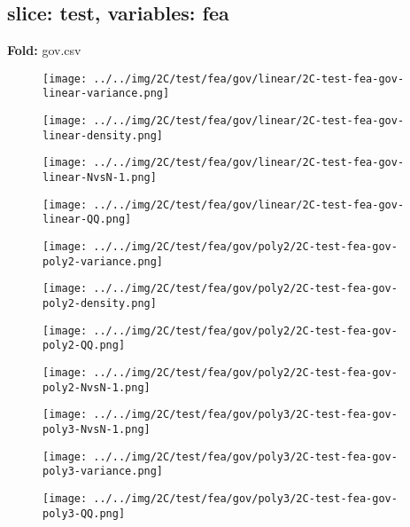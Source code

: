 \subsection{slice: test, variables: fea}
\textbf{Fold:} gov.csv
\begin{figure}[H]
\centering	\texttt{[image: ../../img/2C/test/fea/gov/linear/2C-test-fea-gov-linear-variance.png]}
\end{figure}
\begin{figure}[H]
\centering	\texttt{[image: ../../img/2C/test/fea/gov/linear/2C-test-fea-gov-linear-density.png]}
\end{figure}
\begin{figure}[H]
\centering	\texttt{[image: ../../img/2C/test/fea/gov/linear/2C-test-fea-gov-linear-NvsN-1.png]}
\end{figure}
\begin{figure}[H]
\centering	\texttt{[image: ../../img/2C/test/fea/gov/linear/2C-test-fea-gov-linear-QQ.png]}
\end{figure}
\begin{figure}[H]
\centering	\texttt{[image: ../../img/2C/test/fea/gov/poly2/2C-test-fea-gov-poly2-variance.png]}
\end{figure}
\begin{figure}[H]
\centering	\texttt{[image: ../../img/2C/test/fea/gov/poly2/2C-test-fea-gov-poly2-density.png]}
\end{figure}
\begin{figure}[H]
\centering	\texttt{[image: ../../img/2C/test/fea/gov/poly2/2C-test-fea-gov-poly2-QQ.png]}
\end{figure}
\begin{figure}[H]
\centering	\texttt{[image: ../../img/2C/test/fea/gov/poly2/2C-test-fea-gov-poly2-NvsN-1.png]}
\end{figure}
\begin{figure}[H]
\centering	\texttt{[image: ../../img/2C/test/fea/gov/poly3/2C-test-fea-gov-poly3-NvsN-1.png]}
\end{figure}
\begin{figure}[H]
\centering	\texttt{[image: ../../img/2C/test/fea/gov/poly3/2C-test-fea-gov-poly3-variance.png]}
\end{figure}
\begin{figure}[H]
\centering	\texttt{[image: ../../img/2C/test/fea/gov/poly3/2C-test-fea-gov-poly3-QQ.png]}
\end{figure}
